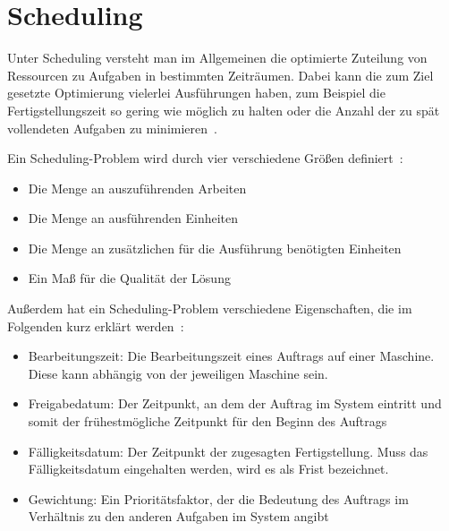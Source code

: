 \section{Scheduling}\label{CAP:scheduling}
Unter Scheduling versteht man im Allgemeinen die optimierte Zuteilung von Ressourcen zu Aufgaben in bestimmten Zeiträumen.
Dabei kann die zum Ziel gesetzte Optimierung vielerlei Ausführungen haben, zum Beispiel die Fertigstellungszeit so gering wie möglich zu halten oder die Anzahl der zu spät vollendeten Aufgaben zu minimieren~\cite{Gawiejnowicz.2020}.

Ein Scheduling-Problem wird durch vier verschiedene Größen definiert~\cite{Gawiejnowicz.2020}:
\begin{itemize}
 \item Die Menge an auszuführenden Arbeiten
 \item Die Menge an ausführenden Einheiten
 \item Die Menge an zusätzlichen für die Ausführung benötigten Einheiten
 \item Ein Maß für die Qualität der Lösung
\end {itemize}
Außerdem hat ein Scheduling-Problem verschiedene Eigenschaften, die im Folgenden kurz erklärt werden~\cite{Pinedo.2022}:
\begin{itemize}
 \item Bearbeitungszeit: Die Bearbeitungszeit eines Auftrags auf einer Maschine. Diese kann abhängig von der jeweiligen Maschine sein.
 \item Freigabedatum: Der Zeitpunkt, an dem der Auftrag im System eintritt und somit der frühestmögliche Zeitpunkt für den Beginn des Auftrags
 \item Fälligkeitsdatum: Der Zeitpunkt der zugesagten Fertigstellung. Muss das Fälligkeitsdatum eingehalten werden, wird es als Frist bezeichnet.
 \item Gewichtung: Ein Prioritätsfaktor, der die Bedeutung des Auftrags im Verhältnis zu den anderen Aufgaben im System angibt
\end{itemize}

